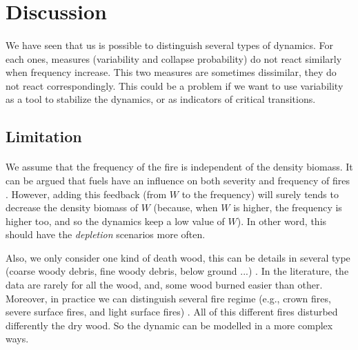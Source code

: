 \documentclass{article}
\begin{document}


\newpage
\section{Discussion}
\label{Discussion}

\paragraph{} %
We have seen that us is possible to distinguish several types of dynamics. For each ones, measures (variability and collapse probability) do not react similarly when frequency increase. This two measures are sometimes dissimilar, they do not react correspondingly. This could be a problem if we want to use variability as a tool to stabilize the dynamics, or as indicators of critical transitions.





\subsection{Limitation}

\paragraph{}
We assume that the frequency of the fire is independent of the density biomass. It can be argued that fuels have an influence on both severity and frequency  of fires \citep{schoennagel_interaction_2004}. However, adding this feedback (from $W$ to the frequency) will surely tends to decrease the density biomass of $W$ (because, when $W$ is higher, the frequency is higher too, and so the dynamics keep a low value of $W$). In other word, this should have the \textit{depletion} scenarios more often.

Also, we only consider one kind of death wood, this can be details in several type (coarse woody debris, fine woody debris, below ground ...) \citep{russell_quantifying_2015}. In the literature, the data are rarely for all the wood, and, some wood burned easier than other. Moreover, in practice we can distinguish several fire regime (e.g., crown fires, severe surface fires, and light surface fires) \citep{reichle_fire_1981}. All of this different fires disturbed differently the dry wood. So the dynamic can be modelled in a more complex ways.
\end{document}

